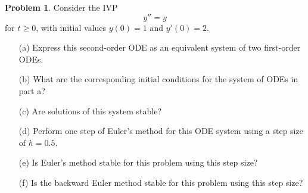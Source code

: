 \documentclass[a4paper]{book}
\numberwithin{equation}{chapter}
\theoremstyle{definition}
\newtheorem{pro}{Problem}
\begin{document}
  \begin{pro}
    Consider the IVP
    \begin{displaymath}
      y'' = y
    \end{displaymath}
    for $t\ge 0$,
    with initial values $y(0)=1$ and $y'(0)=2$.
    \begin{itemize}
    \item[(a)]
      Express this second-order ODE as
      an equivalent system of two first-order ODEs.
  
    \item[(b)]
      What are the corresponding initial conditions for the system of
      ODEs in part a?
  
    \item[(c)]
      Are solutions of this system stable?
  
    \item[(d)]
      Perform one step of Euler's method for this ODE system
      using a step size of $h=0.5$.
  
    \item[(e)]
      Is Euler's method stable for this problem using this step size?
  
    \item[(f)]
      Is the backward Euler method stable for this problem
      using this step size?
    \end{itemize}
  \end{pro}
  
\end{document}
